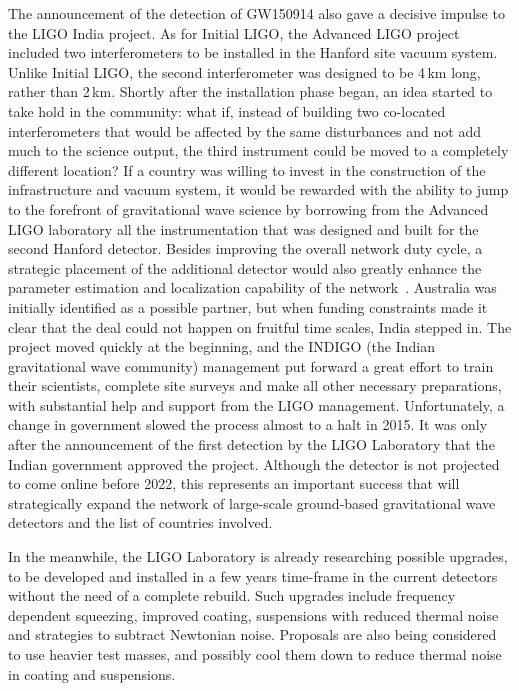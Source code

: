 The announcement of the detection of GW150914 also gave a decisive impulse to the LIGO India project.
As for Initial LIGO, the Advanced LIGO project included two interferometers to be installed in the Hanford site vacuum system.
Unlike Initial LIGO, the second interferometer was designed to be 4\,km long, rather than 2\,km. 
Shortly after the installation phase began, an idea started to take hold in the community: what if, instead of building two co-located interferometers that would be affected by the same disturbances and not add much to the science output, the third instrument could be moved to a completely different location? 
If a country was willing to invest in the construction of the infrastructure and vacuum system, it would be rewarded with the ability to jump to the forefront of gravitational wave science by borrowing from the Advanced LIGO laboratory all the instrumentation that was designed and built for the second Hanford detector. 
Besides improving the overall network duty cycle, a strategic placement of the additional detector would also greatly enhance the parameter estimation and localization capability of the network~\cite{Klimenko_2016}.
Australia was initially identified as a possible partner, but when funding constraints made it clear that the deal could not happen on fruitful time scales, India stepped in.
The project moved quickly at the beginning, and the INDIGO (the Indian gravitational wave community) management put forward a great effort to train their scientists, complete site surveys and make all other necessary preparations, with substantial help and support from the LIGO management.
Unfortunately, a change in government slowed the process almost to a halt in 2015. 
It was only after the announcement of the first detection by the LIGO Laboratory that the Indian government approved the project. 
Although the detector is not projected to come online before 2022, this represents an important success that will strategically expand the network of large-scale ground-based gravitational wave detectors and the list of countries involved.

In the meanwhile, the LIGO Laboratory is already researching possible upgrades, to be developed and installed in a few years time-frame in the current detectors without the need of a complete rebuild.
Such upgrades include frequency dependent squeezing, improved coating, suspensions with reduced thermal noise and strategies to subtract Newtonian noise.
Proposals are also being considered to use heavier test masses, and possibly cool them down to reduce thermal noise in coating and suspensions.

